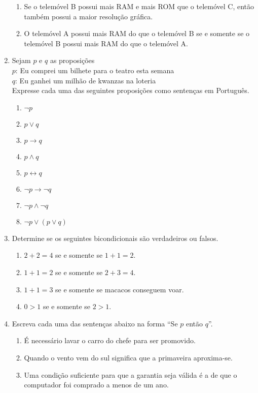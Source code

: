 \begin{enumerate}
\begin{enumerate}
  		 \item Se o telemóvel B possui mais RAM e mais ROM que o telemóvel C, então também possui a maior resolução gráfica.
  		 \item O telemóvel A possui mais RAM do que o telemóvel B se e somente se o telemóvel B possui mais RAM do que o telemóvel A.
	\end{enumerate}
	\item Sejam $p$ e $q$ as proposições\\
	\hspace*{1em}$p$: Eu comprei um bilhete para o teatro esta semana\\
	\hspace*{1em}$q$: Eu ganhei um milhão de kwanzas na loteria\\
	Expresse cada uma das seguintes proposições como sentenças em Português.
	\begin{enumerate}
		  \item $\lnot p$
		  \item $p \lor q$
		  \item $p \to q$
		  \item $p \land q$
		  \item $p \leftrightarrow q$
		  \item $\lnot p \to \lnot q$
		  \item $\lnot p \land \lnot q$
		  \item $\lnot p \lor (p \lor q)$
  	\end{enumerate}
  	\item Determine se os seguintes bicondicionais são verdadeiros ou falsos.
  	\begin{enumerate}
  		\item $2+2=4$ se e somente se $1+1=2$.
  		\item $1+1=2$ se e somente se $2+3=4$.
  		\item $1+1=3$ se e somente se macacos conseguem voar.
  		\item $0 > 1$ se e somente se $2>1$.
	\end{enumerate}
  	\item Escreva cada uma das sentenças abaixo na forma ``Se $p$ então $q$''.
  	\begin{enumerate}
  	  \item É necessário lavar o carro do chefe para ser promovido.
  	  \item Quando o vento vem do sul significa que a primaveira aproxima-se.
  	  \item Uma condição suficiente para que a garantia seja válida é a de que o computador foi comprado a menos de um ano.

\end{enumerate}
\end{enumerate}
